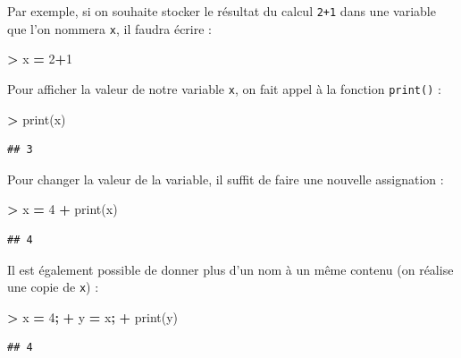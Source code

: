 \documentclass[12pt,]{book}
\newenvironment{Shaded}{\begin{snugshade}}{\end{snugshade}}
\newcommand{\DecValTok}[1]{\textcolor[rgb]{0.00,0.00,0.81}{#1}}
\newcommand{\OperatorTok}[1]{\textcolor[rgb]{0.81,0.36,0.00}{\textbf{#1}}}
\newcommand{\BuiltInTok}[1]{#1}
\newcommand{\NormalTok}[1]{#1}
\numberwithin{equation}{section}
\numberwithin{countremarque}{section}
\begin{document}
Par exemple, si on souhaite stocker le résultat du calcul \texttt{2+1}
dans une variable que l'on nommera \texttt{x}, il faudra écrire :

\begin{Shaded}
\begin{Highlighting}[]
\OperatorTok{>}\NormalTok{ x }\OperatorTok{=} \DecValTok{2}\OperatorTok{+}\DecValTok{1}
\end{Highlighting}
\end{Shaded}

Pour afficher la valeur de notre variable \texttt{x}, on fait appel à la
fonction \texttt{print()} :

\begin{Shaded}
\begin{Highlighting}[]
\OperatorTok{>} \BuiltInTok{print}\NormalTok{(x)}
\end{Highlighting}
\end{Shaded}

\begin{lstlisting}
## 3
\end{lstlisting}

Pour changer la valeur de la variable, il suffit de faire une nouvelle
assignation :

\begin{Shaded}
\begin{Highlighting}[]
\OperatorTok{>}\NormalTok{ x }\OperatorTok{=} \DecValTok{4}
\OperatorTok{+} \BuiltInTok{print}\NormalTok{(x)}
\end{Highlighting}
\end{Shaded}

\begin{lstlisting}
## 4
\end{lstlisting}

Il est également possible de donner plus d'un nom à un même contenu (on
réalise une copie de \texttt{x}) :

\begin{Shaded}
\begin{Highlighting}[]
\OperatorTok{>}\NormalTok{ x }\OperatorTok{=} \DecValTok{4}\OperatorTok{;}
\OperatorTok{+}\NormalTok{ y }\OperatorTok{=}\NormalTok{ x}\OperatorTok{;}
\OperatorTok{+} \BuiltInTok{print}\NormalTok{(y)}
\end{Highlighting}
\end{Shaded}

\begin{lstlisting}
## 4
\end{lstlisting}
\end{document}
